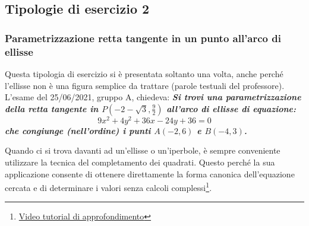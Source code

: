 \documentclass[a4paper]{article}
\begin{document}
	\subsection{Tipologie di esercizio 2}

	\subsubsection{Parametrizzazione retta tangente in un punto all'arco di ellisse}\label{par: parametrizzazione retta tangente in un punto all'arco di ellisse}

	Questa tipologia di esercizio si è presentata soltanto una volta, anche perché l'ellisse non è una figura semplice da trattare (parole testuali del professore). L'esame del 25/06/2021, gruppo A, chiedeva: \textcolor{Green4}{\textbf{\emph{Si trovi una parametrizzazione della retta tangente in $P\left(-2-\sqrt{3}, \frac{9}{2}\right)$ all'arco di ellisse di equazione:}}
	\begin{equation*}
		9x^{2} + 4y^{2} + 36x - 24y + 36 = 0
	\end{equation*}
	\textbf{\emph{che congiunge (nell'ordine) i punti $A\left(-2,6\right)$ e $B\left(-4,3\right)$.}}}\newline

	\noindent
	Quando ci si trova davanti ad un'ellisse o un'iperbole, è sempre conveniente utilizzare la tecnica del completamento dei quadrati. Questo perché la sua applicazione consente di ottenere direttamente la forma canonica dell'equazione cercata e di determinare i valori senza calcoli complessi\footnote{\href{https://youtu.be/a4ST5Kmjtxk}{Video tutorial di approfondimento}}.\newline
\end{document}
